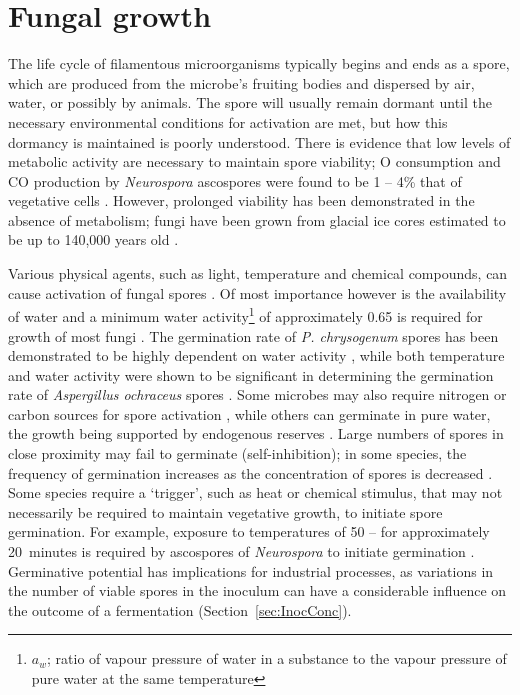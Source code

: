 \section{Fungal growth}

The life cycle of filamentous microorganisms typically begins and ends as a spore, which are produced from the microbe's fruiting bodies and dispersed by air, water, or possibly by animals. The spore will usually remain dormant until the necessary environmental conditions for activation are met, but how this dormancy is maintained is poorly understood. There is evidence that low levels of metabolic activity are necessary to maintain spore viability; O consumption and CO production by \emph{Neurospora} ascospores were found to be 1 -- 4\% that of vegetative cells \cite{carlile2001}. However, prolonged viability has been demonstrated in the absence of metabolism; fungi have been grown from glacial ice cores estimated to be up to 140,000 years old \cite{carlile2001}.

Various physical agents, such as light, temperature and chemical compounds, can cause activation of fungal spores \cite{tauro1986}. Of most importance however is the availability of water and a minimum water activity\footnote{$a_w$; ratio of vapour pressure of water in a substance to the vapour pressure of pure water at the same temperature} of approximately 0.65 is required for growth of most fungi \cite{walker2005}. The germination rate of \emph{P. chrysogenum} spores has been demonstrated to be highly dependent on water activity \cite{sautour2001}, while both temperature and water activity were shown to be significant in determining the germination rate of \emph{Aspergillus ochraceus} spores \cite{pardo2005}. Some microbes may also require nitrogen or carbon sources for spore activation \cite{medwid1984}, while others can germinate in pure water, the growth being supported by endogenous reserves \cite{carlile2001}. Large numbers of spores in close proximity may fail to germinate (self-inhibition); in some species, the frequency of germination increases as the concentration of spores is decreased \cite{moore-landecker1996}. Some species require a \lq trigger', such as heat or chemical stimulus, that may not necessarily be required to maintain vegetative growth, to initiate spore germination. For example, exposure to temperatures of 50 --  for approximately 20~minutes is required by ascospores of \emph{Neurospora} to initiate germination \cite{moore-landecker1996}. Germinative potential has implications for industrial processes, as variations in the number of viable spores in the inoculum can have a considerable influence on the outcome of a fermentation (Section~\ref{sec:InocConc}).

